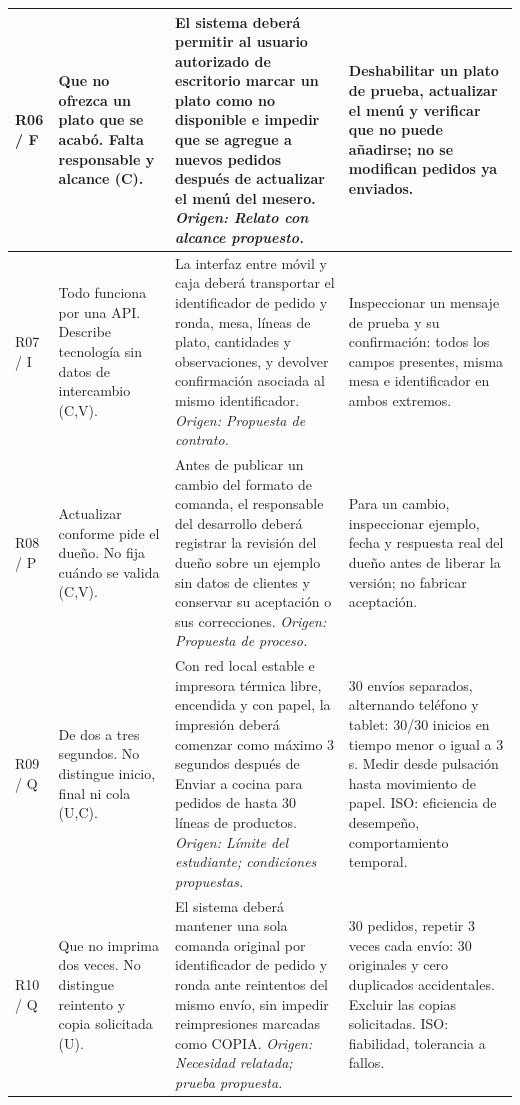 \documentclass[11pt,a4paper]{article}
\begin{document}
\begin{longtable}{|L{1.1cm}|L{3.2cm}|L{6.2cm}|L{4.7cm}|}
R06 / F & Que no ofrezca un plato que se acabó. Falta responsable y alcance (C). & El sistema deberá permitir al usuario autorizado de escritorio marcar un plato como no disponible e impedir que se agregue a nuevos pedidos después de actualizar el menú del mesero. \textit{Origen: Relato con alcance propuesto.} & Deshabilitar un plato de prueba, actualizar el menú y verificar que no puede añadirse; no se modifican pedidos ya enviados. \\ \hline
R07 / I & Todo funciona por una API. Describe tecnología sin datos de intercambio (C,V). & La interfaz entre móvil y caja deberá transportar el identificador de pedido y ronda, mesa, líneas de plato, cantidades y observaciones, y devolver confirmación asociada al mismo identificador. \textit{Origen: Propuesta de contrato.} & Inspeccionar un mensaje de prueba y su confirmación: todos los campos presentes, misma mesa e identificador en ambos extremos. \\ \hline
R08 / P & Actualizar conforme pide el dueño. No fija cuándo se valida (C,V). & Antes de publicar un cambio del formato de comanda, el responsable del desarrollo deberá registrar la revisión del dueño sobre un ejemplo sin datos de clientes y conservar su aceptación o sus correcciones. \textit{Origen: Propuesta de proceso.} & Para un cambio, inspeccionar ejemplo, fecha y respuesta real del dueño antes de liberar la versión; no fabricar aceptación. \\ \hline
R09 / Q & De dos a tres segundos. No distingue inicio, final ni cola (U,C). & Con red local estable e impresora térmica libre, encendida y con papel, la impresión deberá comenzar como máximo 3 segundos después de Enviar a cocina para pedidos de hasta 30 líneas de productos. \textit{Origen: Límite del estudiante; condiciones propuestas.} & 30 envíos separados, alternando teléfono y tablet: 30/30 inicios en tiempo menor o igual a 3 s. Medir desde pulsación hasta movimiento de papel. ISO: eficiencia de desempeño, comportamiento temporal. \\ \hline
R10 / Q & Que no imprima dos veces. No distingue reintento y copia solicitada (U). & El sistema deberá mantener una sola comanda original por identificador de pedido y ronda ante reintentos del mismo envío, sin impedir reimpresiones marcadas como COPIA. \textit{Origen: Necesidad relatada; prueba propuesta.} & 30 pedidos, repetir 3 veces cada envío: 30 originales y cero duplicados accidentales. Excluir las copias solicitadas. ISO: fiabilidad, tolerancia a fallos. \\ \hline

\end{longtable}
\end{document}
